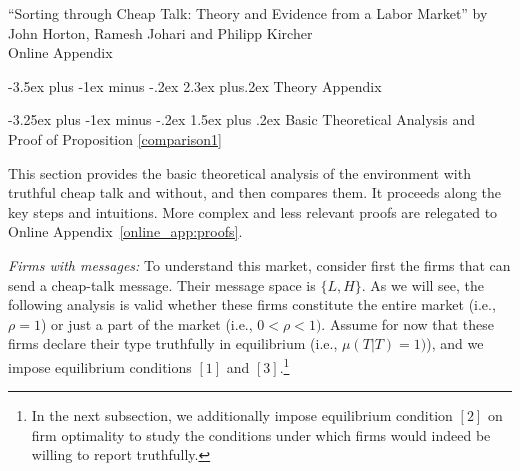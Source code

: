 \documentclass[12pt]{article}
\makeatletter
\renewcommand{\thesection}{\Roman{section}}
\renewcommand{\thesubsection}{\Roman{section}.\Alph{subsection}}
\renewcommand{\section}{%
  \@startsection{section}{1}{\z@}%
  {-3.5ex plus -1ex minus -.2ex}%
  {2.3ex plus.2ex}%
  {\normalfont\Large\bfseries}%
}
\renewcommand{\subsection}{%
  \@startsection{subsection}{2}{\z@}%
  {-3.25ex plus -1ex minus -.2ex}%
  {1.5ex plus .2ex}%
  {\normalfont\large\bfseries}%
}
\makeatother
\begin{document}
\newpage
\appendix
\renewcommand{\thesection}{\Alph{section}}
\renewcommand{\thesubsection}{\Alph{section}.\arabic{subsection}}
\setcounter{section}{0} %
\setcounter{page}{1}

\begin{centering}
    \Large{``Sorting through Cheap Talk: Theory and Evidence from a Labor Market'' by John Horton, Ramesh Johari and Philipp Kircher \\ \bigskip 
    \LARGE Online Appendix
    \\ \bigskip}
\end{centering}



\section{Theory Appendix}


\subsection{Basic Theoretical Analysis and Proof of Proposition \ref{comparison1}
\label{online_app:analysis}}

This section provides the basic theoretical analysis of the environment with truthful cheap talk and without, and then compares them. It proceeds along the key steps and intuitions. More complex and less relevant proofs are relegated to Online Appendix~\ref{online_app:proofs}.

\textit{Firms with messages:} To understand this market, consider first the
firms that can send a cheap-talk message. Their message space is $\{L,H\}.$
As we will see, the following analysis is valid whether these firms
constitute the entire market (i.e., $\rho =1$) or just a part of the market
(i.e., $0<\rho <1).$ Assume for now that these firms declare their type
truthfully in equilibrium (i.e., $\mu (T|T)=1)$), and we impose equilibrium
conditions $[1]$ and $[3]$.\footnote{In the next subsection, we additionally impose
equilibrium condition $[2]$ on firm optimality to study the conditions under
which firms would indeed be willing to report truthfully.}
\end{document}
